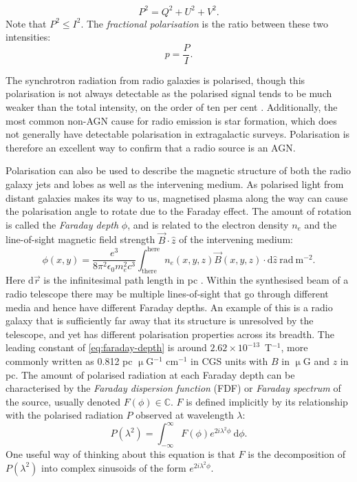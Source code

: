 \documentclass[11pt, a4paper]{book}
\newcommand{\defn}[1]{\emph{#1}}
\begin{document}
        \begin{equation}
            \label{eq:polarised-intensity}
            P^2 = Q^2 + U^2 + V^2.
        \end{equation}
        Note that $P^2 \leq I^2$. The \defn{fractional polarisation} is the ratio between these two intensities:
        \begin{equation}
            p = \frac{P}{I}.
        \end{equation}

        The synchrotron radiation from radio galaxies is polarised, though this polarisation is not always detectable as the polarised signal tends to be much weaker than the total intensity, on the order of ten per cent \citep{osullivan_magnetic_2015}. Additionally, the most common non-AGN cause for radio emission is star formation, which does not generally have detectable polarisation in extragalactic surveys. Polarisation is therefore an excellent way to confirm that a radio source is an AGN.

        Polarisation can also be used to describe the magnetic structure of both the radio galaxy jets and lobes as well as the intervening medium. As polarised light from distant galaxies makes its way to us, magnetised plasma along the way can cause the polarisation angle to rotate due to the Faraday effect. The amount of rotation is called the \defn{Faraday depth} $\phi$, and is related to the electron density $n_e$ and the line-of-sight magnetic field strength $\vec B \cdot \hat{z}$ of the intervening medium:
        \begin{equation}
            \label{eq:faraday-depth}
            \phi(x, y) = \frac{e^3}{8\pi^2\epsilon_0m_e^2c^3} \int_{\mathrm{there}}^{\mathrm{here}} n_e(x, y, z) \vec B(x, y, z) \cdot \mathrm{d}\hat{z}\ \mathrm{rad}\ \mathrm{m}^{-2}.
        \end{equation}
        Here $\mathrm{d}\vec r$ is the infinitesimal path length in pc \citep{brentjens_faraday_2005}. Within the synthesised beam of a radio telescope there may be multiple lines-of-sight that go through different media and hence have different Faraday depths. An example of this is a radio galaxy that is sufficiently far away that its structure is unresolved by the telescope, and yet has different polarisation properties across its breadth. The leading constant of \autoref{eq:faraday-depth} is around $2.62 \times 10^{-13}$~T$^{-1}$, more commonly written as 0.812 pc $\upmu$G$^{-1}$ cm$^{-1}$ in CGS units with $B$ in $\upmu$G and $z$ in pc. The amount of polarised radiation at each Faraday depth can be characterised by the \defn{Faraday dispersion function} (FDF) or \defn{Faraday spectrum} of the source, usually denoted $F(\phi) \in \mathbb C$. $F$ is defined implicitly by its relationship with the polarised radiation $P$ observed at wavelength $\lambda$:
        \begin{equation}
            \label{eq:faraday-dispersion-function}
            P(\lambda^2) = \int_{-\infty}^\infty F(\phi) e^{2i\lambda^2\phi}\ \mathrm{d}\phi.
        \end{equation}
        One useful way of thinking about this equation is that $F$ is the decomposition of $P(\lambda^2)$ into complex sinusoids of the form $e^{2i\lambda^2\phi}$.
\end{document}
